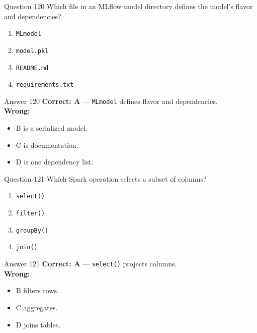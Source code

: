 \documentclass[aspectratio=169,11pt]{beamer}
\begin{document}
	\begin{frame}{Question 120}
		Which file in an MLflow model directory defines the model's flavor and dependencies?
		\begin{enumerate}[label=\Alph*.]
			\item \texttt{MLmodel}
			\item \texttt{model.pkl}
			\item \texttt{README.md}
			\item \texttt{requirements.txt}
		\end{enumerate}
	\end{frame}
	\begin{frame}{Answer 120}
		\textbf{Correct: A} --- \texttt{MLmodel} defines flavor and dependencies.\\
		\vspace{0.5em}
		\textbf{Wrong:}
		\begin{itemize}
			\item B is a serialized model.
			\item C is documentation.
			\item D is one dependency list.
		\end{itemize}
	\end{frame}
	
	\begin{frame}{Question 121}
		Which Spark operation selects a subset of columns?
		\begin{enumerate}[label=\Alph*.]
			\item \texttt{select()}
			\item \texttt{filter()}
			\item \texttt{groupBy()}
			\item \texttt{join()}
		\end{enumerate}
	\end{frame}
	\begin{frame}{Answer 121}
		\textbf{Correct: A} --- \texttt{select()} projects columns.\\
		\vspace{0.5em}
		\textbf{Wrong:}
		\begin{itemize}
			\item B filters rows.
			\item C aggregates.
			\item D joins tables.
		\end{itemize}
	\end{frame}
	
\end{document}
